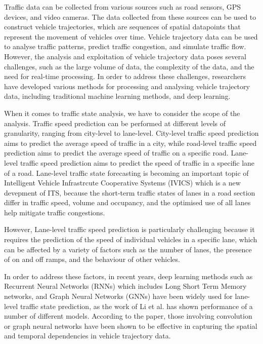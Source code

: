 \documentclass[11pt]{uonthesis}
\begin{document}
Traffic data can be collected from various sources such as road sensors, GPS devices, and video cameras. The data collected from these sources can be used to construct vehicle trajectories, which are sequences of spatial datapoints that represent the movement of vehicles over time. Vehicle trajectory data can be used to analyse traffic patterns, predict traffic congestion, and simulate traffic flow. However, the analysis and exploitation of vehicle trajectory data poses several challenges, such as the large volume of data, the complexity of the data, and the need for real-time processing. In order to address these challenges, researchers have developed various methods for processing and analysing vehicle trajectory data, including traditional machine learning methods, and deep learning. 

When it comes to traffic state analysis, we have to consider the scope of the analysis. Traffic speed prediction can be performed at different levels of granularity, ranging from city-level to lane-level. City-level traffic speed prediction aims to predict the average speed of traffic in a city, while road-level traffic speed prediction aims to predict the average speed of traffic on a specific road. Lane-level traffic speed prediction aims to predict the speed of traffic in a specific lane of a road. Lane-level traffic state forecasting is becoming an important topic of Intelligent Vehicle Infrastrcute Cooperative Systems (IVICS) which is a new devepment of ITS, because the short-term traffic states of lanes in a road section differ in traffic speed, volume and occupancy\cite{GU20191}, and the optimised use of all lanes help mitigate traffic congestions. 

However, Lane-level traffic speed prediction is particularly challenging because it requires the prediction of the speed of individual vehicles in a specific lane, which can be affected by a variety of factors such as the number of lanes, the presence of on and off ramps, and the behaviour of other vehicles.

In order to address these factors, in recent years, deep learning methods such as Recurrent Neural Networks (RNNs) which includes Long Short Term Memory networks, and Graph Neural Networks (GNNs) have been widely used for lane-level traffic state prediction, as the work of Li et al.\cite{li2024unifyinglaneleveltrafficprediction} has shown performance of a number of different models. According to the paper, those involving convolution or graph neural networks have been shown to be effective in capturing the spatial and temporal dependencies in vehicle trajectory data.
\end{document}
